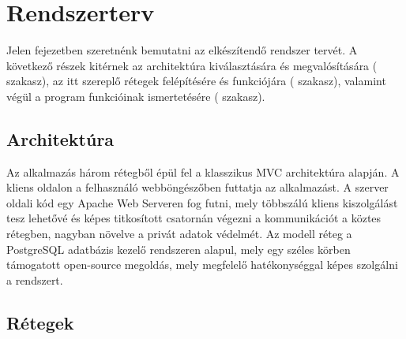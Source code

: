 \chapter{Rendszerterv}\label{sect:rszterv}

Jelen fejezetben szeretnénk bemutatni az elkészítendő rendszer tervét. A következő részek kitérnek az architektúra kiválasztására és megvalósítására ( szakasz), az itt szereplő rétegek felépítésére és funkciójára ( szakasz), valamint végül a program funkcióinak ismertetésére ( szakasz).

\section{Architektúra}\label{sect:architektura}

Az alkalmazás három rétegből épül fel a klasszikus MVC architektúra alapján. A kliens oldalon a felhasználó webböngészőben futtatja az alkalmazást. A szerver oldali kód egy Apache Web Serveren fog futni, mely többszálú kliens kiszolgálást tesz lehetővé és képes titkosított csatornán végezni a kommunikációt a köztes rétegben, nagyban növelve a privát adatok védelmét. Az modell réteg a PostgreSQL adatbázis kezelő rendszeren alapul, mely egy széles körben támogatott open-source megoldás, mely megfelelő hatékonységgal képes szolgálni a rendszert. 


\section{Rétegek}\label{sect:retegek}

